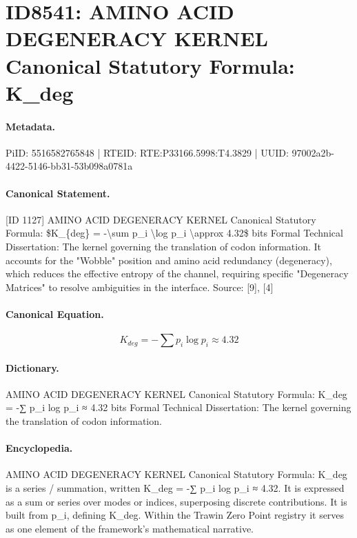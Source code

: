 \section*{ID8541: AMINO ACID DEGENERACY KERNEL Canonical Statutory Formula: K\_deg}
\paragraph{Metadata.}
PiID: 5516582765848 | RTEID: RTE:P33166.5998:T4.3829 | UUID: 97002a2b-4422-5146-bb31-53b098a0781a

\paragraph{Canonical Statement.}
[ID 1127] AMINO ACID DEGENERACY KERNEL Canonical Statutory Formula: \$K\_\{deg\} = -\textbackslash{}sum p\_i \textbackslash{}log p\_i \textbackslash{}approx 4.32\$ bits Formal Technical Dissertation: The kernel governing the translation of codon information. It accounts for the "Wobble" position and amino acid redundancy (degeneracy), which reduces the effective entropy of the channel, requiring specific "Degeneracy Matrices" to resolve ambiguities in the interface. Source: [9], [4]

\paragraph{Canonical Equation.}
\[
K_{deg} = -\sum p_i \log p_i \approx 4.32
\]

\paragraph{Dictionary.}
AMINO ACID DEGENERACY KERNEL Canonical Statutory Formula: K\_deg = -∑ p\_i log p\_i ≈ 4.32 bits Formal Technical Dissertation: The kernel governing the translation of codon information.

\paragraph{Encyclopedia.}
AMINO ACID DEGENERACY KERNEL Canonical Statutory Formula: K\_deg is a series / summation, written K\_deg = -∑ p\_i log p\_i ≈ 4.32. It is expressed as a sum or series over modes or indices, superposing discrete contributions. It is built from p\_i, defining K\_deg. Within the Trawin Zero Point registry it serves as one element of the framework's mathematical narrative.
